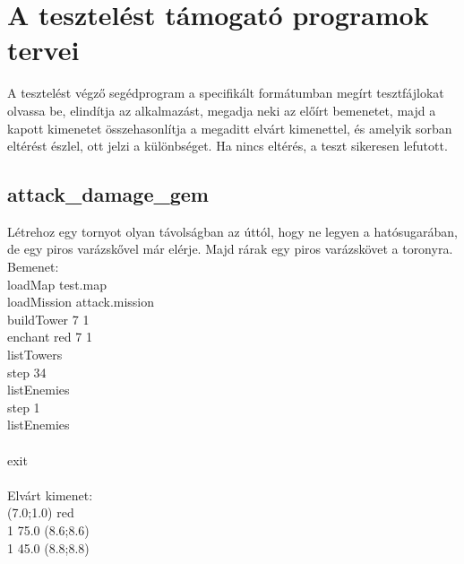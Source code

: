 \section{A tesztelést támogató programok tervei}

A tesztelést végző segédprogram a specifikált formátumban megírt tesztfájlokat olvassa be, elindítja az alkalmazást, megadja neki az előírt bemenetet, majd a kapott kimenetet összehasonlítja a megaditt elvárt kimenettel, és amelyik sorban eltérést észlel, ott jelzi a különbséget. Ha nincs eltérés, a teszt sikeresen lefutott.

\subsection{attack\_damage\_gem}
Létrehoz egy tornyot olyan távolságban az úttól, hogy ne legyen a hatósugarában, de egy piros varázskővel már elérje.
Majd rárak egy piros varázskövet a toronyra.\\
Bemenet:\\
loadMap test.map\\
loadMission attack.mission\\
buildTower 7 1\\
enchant red 7 1\\
listTowers\\
step 34\\
listEnemies\\
step 1\\
listEnemies\\
\\
exit\\ \\
Elvárt kimenet:\\
(7.0;1.0) red \\
1 75.0 (8.6;8.6) \\
1 45.0 (8.8;8.8) \\
\\
